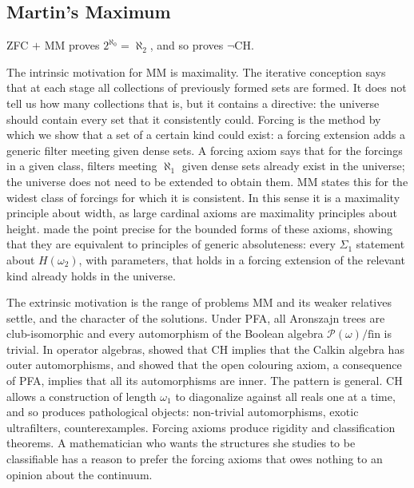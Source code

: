 \documentclass{situationist-preprint}
\begin{document}
\subsection{Martin's Maximum}\label{s:mm}

\begin{lemma}\label{l:mm}
ZFC $+$ MM proves $2^{\aleph_0} = \aleph_2$, and so proves $\neg$CH.
\end{lemma}

The intrinsic motivation for MM is maximality. The iterative conception says that at each stage all collections of previously formed sets are formed. It does not tell us how many collections that is, but it contains a directive: the universe should contain every set that it consistently could. Forcing is the method by which we show that a set of a certain kind could exist: a forcing extension adds a generic filter meeting given dense sets. A forcing axiom says that for the forcings in a given class, filters meeting $\aleph_1$ given dense sets already exist in the universe; the universe does not need to be extended to obtain them. MM states this for the widest class of forcings for which it is consistent. In this sense it is a maximality principle about width, as large cardinal axioms are maximality principles about height. \citet{Bagaria2000} made the point precise for the bounded forms of these axioms, showing that they are equivalent to principles of generic absoluteness: every $\Sigma_1$ statement about $H(\omega_2)$, with parameters, that holds in a forcing extension of the relevant kind already holds in the universe.

The extrinsic motivation is the range of problems MM and its weaker relatives settle, and the character of the solutions. Under PFA, all Aronszajn trees are club-isomorphic and every automorphism of the Boolean algebra $\mathcal{P}(\omega)/\mathrm{fin}$ is trivial. In operator algebras, \citet{PhillipsWeaver2007} showed that CH implies that the Calkin algebra has outer automorphisms, and \citet{Farah2011} showed that the open colouring axiom, a consequence of PFA, implies that all its automorphisms are inner. The pattern is general. CH allows a construction of length $\omega_1$ to diagonalize against all reals one at a time, and so produces pathological objects: non-trivial automorphisms, exotic ultrafilters, counterexamples. Forcing axioms produce rigidity and classification theorems. A mathematician who wants the structures she studies to be classifiable has a reason to prefer the forcing axioms that owes nothing to an opinion about the continuum.
\end{document}
